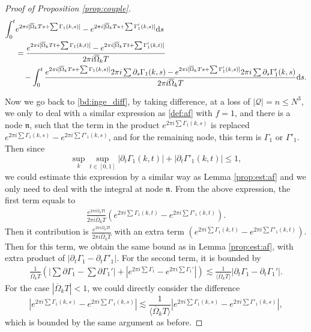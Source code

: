 \documentclass[UTF-8,reqno]{amsart}
\numberwithin{equation}{section}
\theoremstyle{definition}
\def\dif{{\mathord{{\rm d}}}}
\def\leq{\leqslant}
\def\dif{{\mathord{{\rm d}}}}
\def\leq{\leqslant}
\begin{document}
\begin{proof}[Proof of Proposition \ref{prop:couple}]
  \begin{align*}
        \int_0^t &  e^{ 2\pi i[\overline\Omega_kTs+\sum\Gamma_1(k,s)] } - e^{ 2\pi i[\overline\Omega_kTs+\sum \Gamma'_1(k,s)] } \dif s\\
        &= \frac{ e^{ 2\pi i[\overline\Omega_kTt+\sum\Gamma_1(k,t)] }-e^{ 2\pi i[\overline\Omega_kTt+\sum  \Gamma'_1(k,t)] }}{2\pi i\overline\Omega_kT}\\
        &\quad - \int_0^t \frac{  e^{ 2\pi i[\overline\Omega_kTs+\sum\Gamma_1(k,s)] }2\pi i\sum \partial_s\Gamma_1(k,s)- e^{ 2\pi i[\overline\Omega_kTs+\sum \Gamma'_1(k,s)] }2\pi i\sum  \partial_s\Gamma_1'(k,s)}{2\pi i\overline\Omega_kT}   \dif s.
   \end{align*}

Now we go back to \eqref{bd:inge_diff}, by taking difference, at a loss of $|\mathcal{Q}|=n\leq N^3$, we only to deal with a similar expression as \eqref{def:af} with $f=1$, and there is a node $\mathfrak{n}$, such that the  term in the product $e^{ 2\pi i \sum\Gamma_1(k,s) } $ is replaced $ e^{ 2\pi i \sum\Gamma_1(k,s)} - e^{ 2\pi i\sum \Gamma'_1(k,s)} $, and for the remaining node, this term is $\Gamma_1$ or $ \Gamma'_1$. Then since $$\sup_k\sup_{t\in[0,1]}|\partial_t\Gamma_1(k,t)|+|\partial_t\Gamma'_1(k,t)|\leq 1,$$ we  could estimate this expression by a similar way as Lemma \ref{prop:est:af} and we only need to deal with the integral at node $\mathfrak{n}$. From the above expression,  the first term equals to
   \begin{align*}
       \frac{ e^{ 2\pi i\overline\Omega_kTt}}{2\pi i\overline\Omega_kT}(e^{2\pi i\sum\Gamma_1(k,t) }-e^{ 2\pi i \sum  \Gamma'_1(k,t) }).
   \end{align*}  
   Then it contribution is $\frac{ e^{ 2\pi i\overline\Omega_kTt}}{2\pi i\overline\Omega_kT}$ with an extra term $(e^{2\pi i\sum\Gamma_1(k,t) }-e^{ 2\pi i \sum  \Gamma'_1(k,t) })$.  Then for this term, we obtain the same bound as in Lemma \ref{prop:est:af}, with extra  product of $|\partial_t\Gamma_1-\partial_t \Gamma'_1|$.
For the second term, it is bounded by 
   \begin{align*}
  \frac{1}{ \overline\Omega_kT}   \left(  \left | \sum \partial\Gamma_1-\sum\partial \Gamma_1' \right|+ \left|e^{ 2\pi i \sum\Gamma_1} -e^{ 2\pi i \sum \Gamma_1'}  \right|\right)\lesssim \frac{1}{ \langle\overline\Omega_kT\rangle}|\partial_t\Gamma_1-\partial_t\Gamma_1'|.
   \end{align*}
   For the case $|\overline\Omega_kT|< 1$, we could directly consider the difference $$|  e^{ 2\pi i\sum\Gamma_1(k,s) } - e^{ 2\pi i\sum \Gamma'_1(k,s) }|  \lesssim\frac{1}{ \langle\overline\Omega_kT\rangle} |  e^{ 2\pi i\sum\Gamma_1(k,s) } - e^{ 2\pi i\sum \Gamma'_1(k,s) }|,$$ which is bounded by the same argument as before.

\end{proof}
\end{document}
